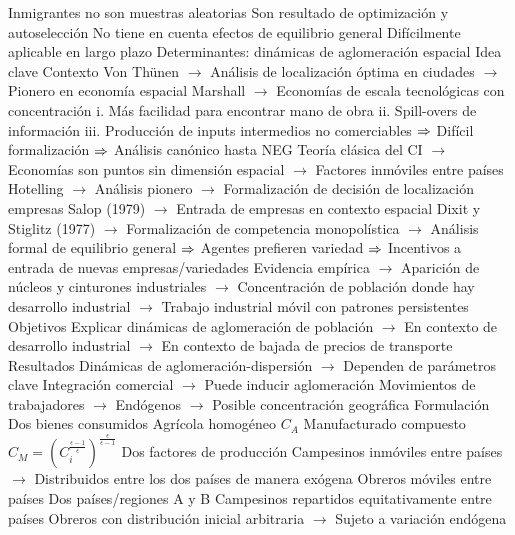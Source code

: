 \documentclass{nuevotema}
\begin{document}
\begin{esquemal}
				\4 Inmigrantes no son muestras aleatorias
				\4[] Son resultado de optimización y autoselección
				\4 No tiene en cuenta efectos de equilibrio general
				\4[] Difícilmente aplicable en largo plazo
		\2 Determinantes: dinámicas de aglomeración espacial
			\3 Idea clave
				\4 Contexto
				\4[] Von Thünen
				\4[] $\to$ Análisis de localización óptima en ciudades
				\4[] $\to$ Pionero en economía espacial
				\4[] Marshall
				\4[] $\to$ Economías de escala tecnológicas con concentración
				\4[] i. Más facilidad para encontrar mano de obra
				\4[] ii. Spill-overs de información
				\4[] iii. Producción de inputs intermedios no comerciables
				\4[] $\Rightarrow$ Difícil formalización
				\4[] $\Rightarrow$ Análisis canónico hasta NEG
				\4[] Teoría clásica del CI
				\4[] $\to$ Economías son puntos sin dimensión espacial
				\4[] $\to$ Factores inmóviles entre países
				\4[] Hotelling
				\4[] $\to$ Análisis pionero
				\4[] $\to$ Formalización de decisión de localización empresas
				\4[] Salop (1979)
				\4[] $\to$ Entrada de empresas en contexto espacial
				\4[] Dixit y Stiglitz (1977)
				\4[] $\to$ Formalización de competencia monopolística
				\4[] $\to$ Análisis formal de equilibrio general
				\4[] $\Rightarrow$ Agentes prefieren variedad
				\4[] $\Rightarrow$ Incentivos a entrada de nuevas empresas/variedades
				\4[] Evidencia empírica
				\4[] $\to$ Aparición de núcleos y cinturones industriales
				\4[] $\to$ Concentración de población donde hay desarrollo industrial
				\4[] $\to$ Trabajo industrial móvil con patrones persistentes
				\4 Objetivos
				\4[] Explicar dinámicas de aglomeración de población
				\4[] $\to$ En contexto de desarrollo industrial
				\4[] $\to$ En contexto de bajada de precios de transporte
				\4 Resultados
				\4[] Dinámicas de aglomeración-dispersión
				\4[] $\to$ Dependen de parámetros clave
				\4[] Integración comercial
				\4[] $\to$ Puede inducir aglomeración
				\4[] Movimientos de trabajadores
				\4[] $\to$ Endógenos
				\4[] $\to$ Posible concentración geográfica
			\3 Formulación
				\4 Dos bienes consumidos
				\4[] Agrícola homogéneo $C_A$
				\4[] Manufacturado compuesto $C_M = \left( C_i^{\frac{\epsilon-1}{\epsilon}} \right)^{\frac{\epsilon}{\epsilon-1}}$
				\4 Dos factores de producción
				\4[] Campesinos inmóviles entre países
				\4[] $\to$ Distribuidos entre los dos países de manera exógena
				\4[] Obreros móviles entre países
				\4 Dos países/regiones A y B
				\4[] Campesinos repartidos equitativamente entre países
				\4[] Obreros con distribución inicial arbitraria
				\4[] $\to$ Sujeto a variación endógena

\end{esquemal}
\end{document}
